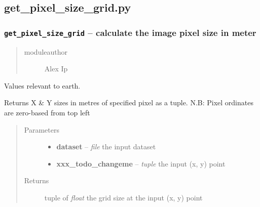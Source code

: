 \documentclass[letterpaper,10pt,english]{sphinxmanual}
\begin{document}
\subsection{get\_pixel\_size\_grid.py}
\label{docs/utilities:get-pixel-size-grid-py}\label{docs/utilities:module-get_pixel_size_grid}

\subsubsection{\texttt{get\_pixel\_size\_grid} -- calculate the image pixel size in meter}
\label{docs/utilities:get-pixel-size-grid-calculate-the-image-pixel-size-in-meter}\begin{quote}\begin{description}
\item[{moduleauthor}] \leavevmode
Alex Ip

\end{description}\end{quote}


\begin{fulllineitems}
\label{docs/utilities:get_pixel_size_grid.Earth}
Values relevant to earth.

\end{fulllineitems}



\begin{fulllineitems}
\label{docs/utilities:get_pixel_size_grid.get_pixel_size}
Returns X \& Y sizes in metres of specified pixel as a tuple.
N.B: Pixel ordinates are zero-based from top left
\begin{quote}\begin{description}
\item[{Parameters}] \leavevmode\begin{itemize}
\item {} 
\textbf{dataset} -- \emph{file} the input dataset

\item {} 
\textbf{xxx\_todo\_changeme} -- \emph{tuple} the input (x, y) point

\end{itemize}

\item[{Returns}] \leavevmode
tuple of \emph{float} the grid size at the input (x, y) point

\end{description}\end{quote}

\end{fulllineitems}
\end{document}
